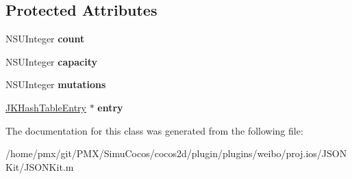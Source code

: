 \subsection*{Protected Attributes}
\begin{DoxyCompactItemize}
\item 
\mbox{\label{interfaceJKDictionary_af9a788a17e658c6f1b66a24fd9b1b42a}} 
N\+S\+U\+Integer {\bfseries count}
\item 
\mbox{\label{interfaceJKDictionary_a0573bbe8650a3d8b075b8f06fd9fe3c6}} 
N\+S\+U\+Integer {\bfseries capacity}
\item 
\mbox{\label{interfaceJKDictionary_ac7f772c0ef0a376a4fe48aca3496ccb3}} 
N\+S\+U\+Integer {\bfseries mutations}
\item 
\mbox{\label{interfaceJKDictionary_ad329317a4a2c0076e67efc69cfc45830}} 
\hyperlink{structJKHashTableEntry}{J\+K\+Hash\+Table\+Entry} $\ast$ {\bfseries entry}
\end{DoxyCompactItemize}


The documentation for this class was generated from the following file\+:\begin{DoxyCompactItemize}
\item 
/home/pmx/git/\+P\+M\+X/\+Simu\+Cocos/cocos2d/plugin/plugins/weibo/proj.\+ios/\+J\+S\+O\+N\+Kit/J\+S\+O\+N\+Kit.\+m\end{DoxyCompactItemize}

